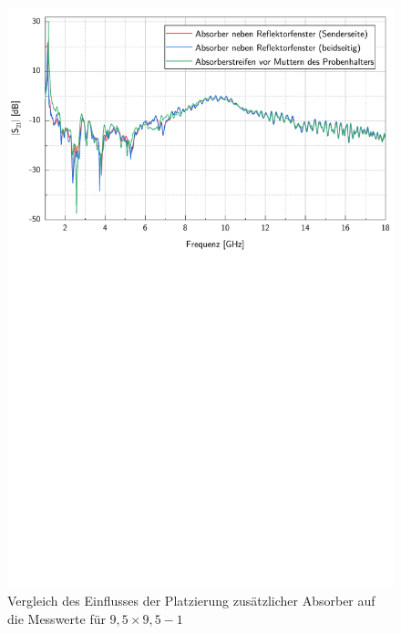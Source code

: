 \begin{figure}[ht]
    \centering
    \includegraphics[page = 1, width = .99\textwidth, trim = 0cm 14.3cm 0cm 0cm, clip]{Abbildungen/Kapitel4/Messergebnisse/9k5x9k5-1.pdf}
    \caption[Vergleich des Einflusses der Platzierung zusätzlicher Absorber auf die Messwerte]{Vergleich des Einflusses der Platzierung zusätzlicher Absorber auf die Messwerte für \mbox{$9,5\times9,5-1$}}
    \label{fig:4_9k5x9k5-1_Absorberplatzierung}
\end{figure}

